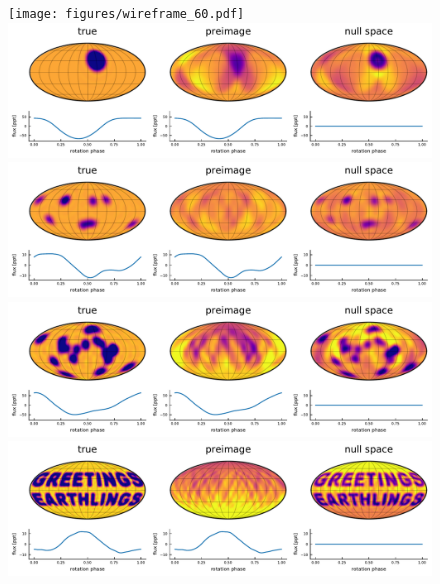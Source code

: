 \documentclass[modern]{aastex62}
\begin{document}
\begin{figure}[p!]
    \begin{centering}
        \vspace{-4em}
        \texttt{[image: figures/wireframe\_60.pdf]}
        \\[0.5em]
        \includegraphics[width=\linewidth]{figures/nullspace_preimage_60a.pdf}
        \\[1em]
        \includegraphics[width=\linewidth]{figures/nullspace_preimage_60b.pdf}
        \\[1em]
        \includegraphics[width=\linewidth]{figures/nullspace_preimage_60c.pdf}
        \\[1em]
        \includegraphics[width=\linewidth]{figures/nullspace_preimage_60d.pdf}
\end{centering}
\end{figure}
\end{document}
